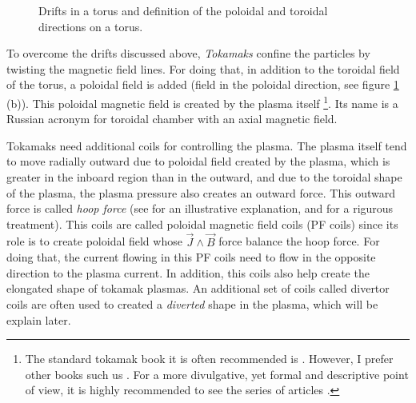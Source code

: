 \documentclass[a4paper,12pt,oneside]{book}
\begin{document}
\begin{figure}[htbp]
\centering
{}
\hfill
{}
\caption{Drifts in a torus and definition of the poloidal and toroidal directions on a torus.}
\label{fig drifts torus}
\end{figure}



To overcome the drifts discussed above, \textit{Tokamaks} confine the particles by twisting the magnetic field lines. For doing that, in addition to the toroidal field of the torus, a poloidal field is added (field in the poloidal direction, see figure \ref{fig drifts torus} (b)). This poloidal magnetic field is created by the plasma itself \footnote{The standard tokamak book it is often recommended is \cite{Wesson}. However, I prefer other books such us \cite{Miyamoto}. For a more divulgative, yet formal and descriptive point of view, it is highly recommended to see the series of articles \cite{Sertok1, Sertok2, Sertok3, Sertok4}.}. Its name is a Russian acronym for toroidal chamber with an axial magnetic field. 

Tokamaks need additional coils for controlling the plasma. The plasma itself tend to move radially outward due to poloidal field created by the plasma, which is greater in the inboard region than in the outward, and due to the toroidal shape of the plasma, the plasma pressure also creates an outward force. This outward force is called \textit{hoop force} (see \cite{Linjin} for an illustrative explanation, and \cite{Miyamoto} for a rigurous treatment). This coils are called poloidal magnetic field coils (PF coils) since its role is to create poloidal field whose $\vec{J} \wedge \vec{B}$ force balance the hoop force. For doing that, the current flowing in this PF coils need to flow in the opposite direction to the plasma current. In addition, this coils also help create the elongated shape of tokamak plasmas. An additional set of coils called divertor coils are often used to created a \textit{diverted} shape in the plasma, which will be explain later. 
\end{document}
